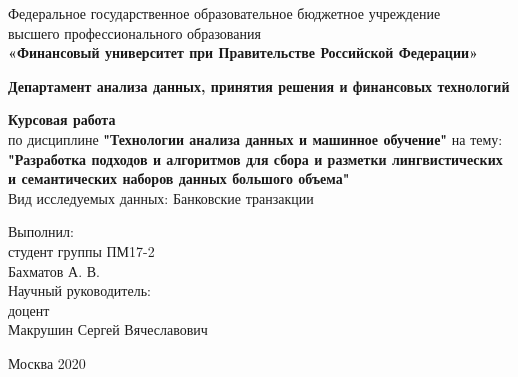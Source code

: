 \documentclass{article}
\begin{document}
                                                         
\newpage
\thispagestyle{empty}

\begin{center}
Федеральное государственное образовательное бюджетное учреждение\\ высшего профессионального образования\\ 
\textbf{«Финансовый университет при Правительстве Российской Федерации»}\\
\end{center}
	
\vspace{2em}
	
\begin{center}
\textbf{Департамент анализа данных, принятия решения и финансовых технологий}\\ 
\end{center}
	
\vspace{2em}
	
\begin{center}
\textbf{Курсовая работа\\
\vspace{3mm}}
по дисциплине \textbf{"Технологии анализа данных и машинное обучение"} на тему: \\ \vspace{2em} \textbf{"Разработка подходов и алгоритмов для сбора и разметки лингвистических и семантических наборов данных большого объема"}\\
\vspace{3mm}
Вид исследуемых данных: Банковские транзакции\\
\end{center}
	
\vspace{6em}
		
\begin{flushright}
Выполнил:\\
студент группы ПМ17-2\\
Бахматов А. В.\\
Научный руководитель:\\
доцент\\
Макрушин Сергей Вячеславович
\end{flushright}

\vspace{\fill}
	
\begin{center}
Москва 2020
\end{center}
\end{document}
